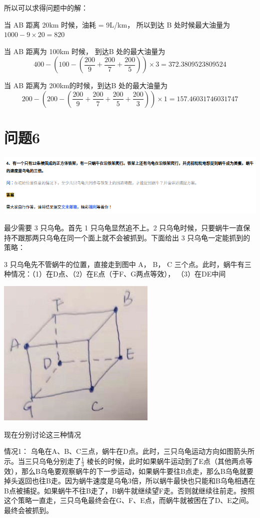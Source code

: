 \documentclass{article}
\begin{document}
所以可以求得问题中的解：


当 AB 距离 20km 时候，油耗 = 9L/km， 所以到达 B 处时候最大油量为 $1000 - 9 \times 20 = 820$

当 AB 距离为 100km 时候， 到达B 处的最大油量为
$$ 
400 - (100 - (\frac{200}{9} + \frac{200}{7} + \frac{200}{5})) \times 3 = 372.3809523809524
$$


当 AB 距离为 200km的时候，到达B 处的最大油量为
$$
200 - (200 - (\frac{200}{9} + \frac{200}{7} + \frac{200}{5} + \frac{200}{3})) \times 1 = 157.46031746031747
$$

\newpage
\section{问题6}
\includegraphics[scale=0.5]{turtle.png}

最少需要 3 只乌龟。首先 1 只乌龟显然追不上。2 只乌龟时候，只要蜗牛一直保持不跟那两只乌龟在同一个面上就不会被抓到。下面给出 3 只乌龟一定能抓到的策略：

3 只乌龟先不管蜗牛的位置，直接走到图中 A， B， C 三个点。此时，蜗牛有三种情况：（1）在D点、（2）在E点（于F、G两点等效）， （3）在DE中间

\includegraphics[scale=0.5]{cube01.png}

\vspace{60pt}

现在分别讨论这三种情况

情况1： 乌龟在A、B、C三点，蜗牛在D点。此时，三只乌龟运动方向如图箭头所示。当三只乌龟分别走了$\frac{1}{3}$ 棱长的时候，此时如果蜗牛运动到了E点（其他两点等效），那么B乌龟要观察蜗牛的下一步运动，如果蜗牛要往B点走，那么B乌龟就要掉头返回也往B走。因为蜗牛速度是乌龟3倍，所以蜗牛最快也只能和B乌龟相遇在B点被捕捉。如果蜗牛不往B走了，B蜗牛就继续望F走。否则就继续往前走。按照这个策略一直走，三只乌龟最终会在G、F、E点，而蜗牛就被困在了D、E之间。最终会被抓到。
\end{document}
